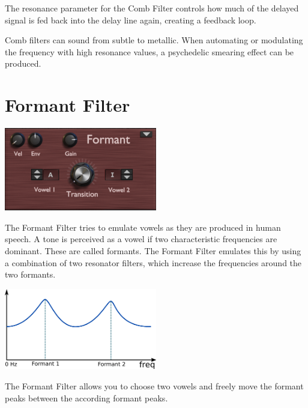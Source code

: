 The resonance parameter for the Comb Filter controls how much of the delayed signal is fed back into the delay line again, creating a feedback loop.

Comb filters can sound from subtle to metallic. When automating or modulating the frequency with high resonance values, a psychedelic smearing effect can be produced.


\section{Formant Filter}
\begin{center}
    \includegraphics[width=0.5\textwidth]{graphics/formant_filter.png}
\end{center}
The Formant Filter tries to emulate vowels as they are produced in human speech. A tone is perceived as a vowel if two characteristic frequencies are dominant. These are called formants. The Formant Filter emulates this by using a combination of two resonator filters, which increase the frequencies around the two formants.

\begin{center}
    \includegraphics[width=0.5\textwidth]{graphics/formant_response.png}
\end{center}

The Formant Filter allows you to choose two vowels and freely move the formant peaks between the according formant peaks.


